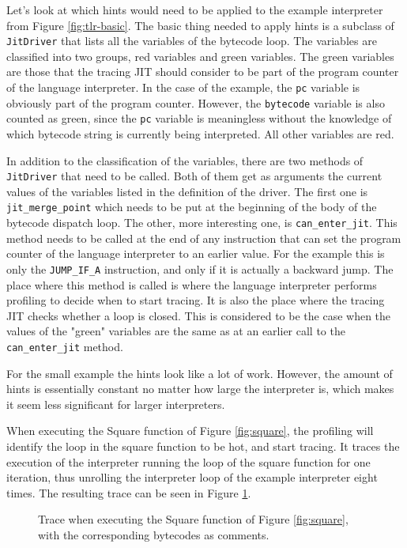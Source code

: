 \documentclass{acm_proc_article-sp}
\begin{document}
Let's look at which hints would need to be applied to the example interpreter
from Figure \ref{fig:tlr-basic}. The basic thing needed to apply hints is a
subclass of \texttt{JitDriver} that lists all the variables of the bytecode
loop. The variables are classified into two groups, red variables and green
variables. The green variables are those that the tracing JIT should consider to
be part of the program counter of the language interpreter. In the case of the
example, the \texttt{pc} variable is obviously part of the program counter.
However, the \texttt{bytecode} variable is also counted as green, since the
\texttt{pc} variable is meaningless without the knowledge of which bytecode
string is currently being interpreted. All other variables are red.

In addition to the classification of the variables, there are two methods of
\texttt{JitDriver} that need to be called. Both of them get as arguments the
current values of the variables listed in the definition of the driver. The
first one is \texttt{jit\_merge\_point} which needs to be put at the beginning
of the body of the bytecode dispatch loop. The other, more interesting one, is
\texttt{can\_enter\_jit}. This method needs to be called at the end of any
instruction that can set the program counter of the language interpreter to an
earlier value. For the example this is only the \texttt{JUMP\_IF\_A}
instruction, and only if it is actually a backward jump. The place where this
method is called is where the language interpreter performs profiling to decide
when to start tracing. It is also the place where the tracing JIT checks
whether a loop is closed. This is considered to be the case when the values of
the "green" variables are the same as at an earlier call to the
\texttt{can\_enter\_jit} method.

For the small example the hints look like a lot of work. However, the amount of
hints is essentially constant no matter how large the interpreter is, which
makes it seem less significant for larger interpreters.

When executing the Square function of Figure \ref{fig:square}, the profiling
will identify the loop in the square function to be hot, and start tracing. It
traces the execution of the interpreter running the loop of the square function
for one iteration, thus unrolling the interpreter loop of the example
interpreter eight times. The resulting trace can be seen in Figure 
\ref{fig:trace-no-green-folding}.

\begin{figure}

\caption{Trace when executing the Square function of Figure \ref{fig:square},
with the corresponding bytecodes as comments.}
\label{fig:trace-no-green-folding}
\end{figure}
\end{document}
